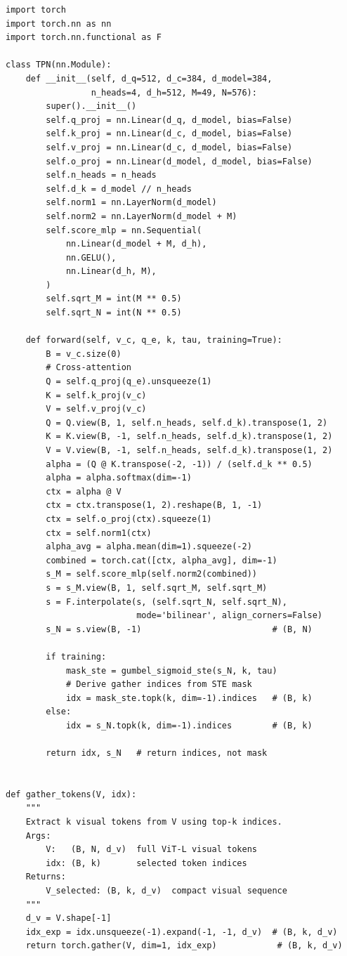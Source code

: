 \documentclass[11pt,a4paper]{article}
\begin{document}
\begin{lstlisting}[caption={TPN module with gather-based token extraction.}]
import torch
import torch.nn as nn
import torch.nn.functional as F

class TPN(nn.Module):
    def __init__(self, d_q=512, d_c=384, d_model=384,
                 n_heads=4, d_h=512, M=49, N=576):
        super().__init__()
        self.q_proj = nn.Linear(d_q, d_model, bias=False)
        self.k_proj = nn.Linear(d_c, d_model, bias=False)
        self.v_proj = nn.Linear(d_c, d_model, bias=False)
        self.o_proj = nn.Linear(d_model, d_model, bias=False)
        self.n_heads = n_heads
        self.d_k = d_model // n_heads
        self.norm1 = nn.LayerNorm(d_model)
        self.norm2 = nn.LayerNorm(d_model + M)
        self.score_mlp = nn.Sequential(
            nn.Linear(d_model + M, d_h),
            nn.GELU(),
            nn.Linear(d_h, M),
        )
        self.sqrt_M = int(M ** 0.5)
        self.sqrt_N = int(N ** 0.5)

    def forward(self, v_c, q_e, k, tau, training=True):
        B = v_c.size(0)
        # Cross-attention
        Q = self.q_proj(q_e).unsqueeze(1)
        K = self.k_proj(v_c)
        V = self.v_proj(v_c)
        Q = Q.view(B, 1, self.n_heads, self.d_k).transpose(1, 2)
        K = K.view(B, -1, self.n_heads, self.d_k).transpose(1, 2)
        V = V.view(B, -1, self.n_heads, self.d_k).transpose(1, 2)
        alpha = (Q @ K.transpose(-2, -1)) / (self.d_k ** 0.5)
        alpha = alpha.softmax(dim=-1)
        ctx = alpha @ V
        ctx = ctx.transpose(1, 2).reshape(B, 1, -1)
        ctx = self.o_proj(ctx).squeeze(1)
        ctx = self.norm1(ctx)
        alpha_avg = alpha.mean(dim=1).squeeze(-2)
        combined = torch.cat([ctx, alpha_avg], dim=-1)
        s_M = self.score_mlp(self.norm2(combined))
        s = s_M.view(B, 1, self.sqrt_M, self.sqrt_M)
        s = F.interpolate(s, (self.sqrt_N, self.sqrt_N),
                          mode='bilinear', align_corners=False)
        s_N = s.view(B, -1)                          # (B, N)

        if training:
            mask_ste = gumbel_sigmoid_ste(s_N, k, tau)
            # Derive gather indices from STE mask
            idx = mask_ste.topk(k, dim=-1).indices   # (B, k)
        else:
            idx = s_N.topk(k, dim=-1).indices        # (B, k)

        return idx, s_N   # return indices, not mask


def gather_tokens(V, idx):
    """
    Extract k visual tokens from V using top-k indices.
    Args:
        V:   (B, N, d_v)  full ViT-L visual tokens
        idx: (B, k)       selected token indices
    Returns:
        V_selected: (B, k, d_v)  compact visual sequence
    """
    d_v = V.shape[-1]
    idx_exp = idx.unsqueeze(-1).expand(-1, -1, d_v)  # (B, k, d_v)
    return torch.gather(V, dim=1, idx_exp)            # (B, k, d_v)
\end{lstlisting}
\end{document}
